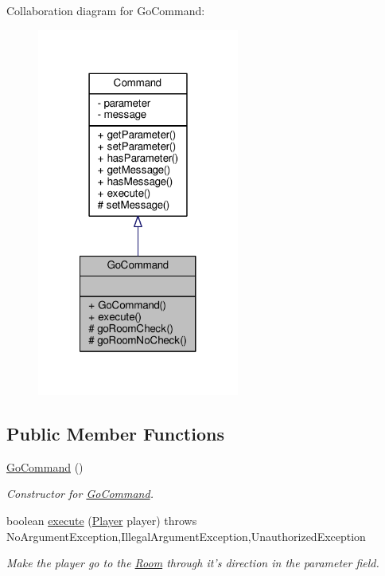 Collaboration diagram for Go\-Command\-:
\nopagebreak
\begin{figure}[H]
\begin{center}
\leavevmode
\includegraphics[width=188pt]{classGoCommand__coll__graph}
\end{center}
\end{figure}
\subsection*{Public Member Functions}
\begin{DoxyCompactItemize}
\item 
\hyperlink{classGoCommand_a30d6bd5c2284b97e76ebe702e1cb1d55}{Go\-Command} ()
\begin{DoxyCompactList}\small\item\em Constructor for \hyperlink{classGoCommand}{Go\-Command}. \end{DoxyCompactList}\item 
boolean \hyperlink{classGoCommand_a77a61c2a3b89dca45b51e06f3bcb3ba7}{execute} (\hyperlink{classPlayer}{Player} player)  throws No\-Argument\-Exception,\-Illegal\-Argument\-Exception,\-Unauthorized\-Exception 
\begin{DoxyCompactList}\small\item\em Make the player go to the \hyperlink{classRoom}{Room} through it's direction in the parameter field. \end{DoxyCompactList}\end{DoxyCompactItemize}
